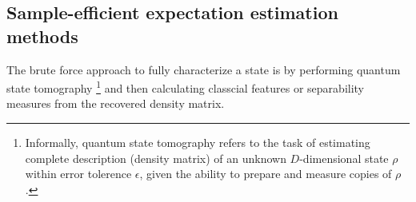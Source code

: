 \documentclass[
reprint,
aps,
pra,
floatfix,
]{revtex4-2}
\theoremstyle{plain}
\theoremstyle{definition}
\newtheorem{problem}{Problem}
\newcommand{\dm}{\rho}
\begin{document}
\subsection{Sample-efficient expectation estimation methods}\label{sec:estimation}
The brute force approach to fully characterize a state is by performing quantum state tomography 
\footnote{Informally, quantum state tomography refers to the task of estimating complete description (density matrix) of an unknown $D$-dimensional state $\dm$ within error tolerence $\epsilon$, 
given the ability to prepare and measure copies of $\dm$.}
and then calculating classcial features or separability measures from the recovered density matrix.
\end{document}

